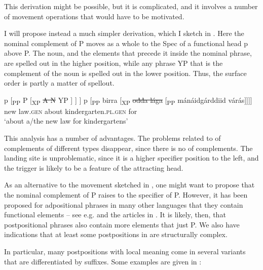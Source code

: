 \documentclass[output=paper]{LSP/langsci}
\begin{document}
This derivation might be possible, but it is complicated, and it involves a {number} of movement operations that would have to be motivated. 

I will propose instead a much simpler derivation, which I sketch in . Here the nominal complement of P moves as a whole to the Spec of a functional head p above P. The noun, and the elements that precede it inside the nominal phrase, are spelled out in the higher position, while any phrase YP that is the complement of the noun is spelled out in the lower position. Thus, the surface order is partly a matter of spellout.


\ea%
    \label{ex:julien:14}
\ea\relax    
[\textsubscript{pP} 
  [\textsubscript{XP} 
    A 
    N 
    \sout{YP}
  ] 
  p 
  [\textsubscript{PP} 
    P 
    [\textsubscript{XP} 
      \sout{A 
      N} 
      YP
    ]
  ]
]
\ex
\gll\relax  [\textsubscript{pP} [\textsubscript{XP} ođđa   {lága \sout{PP}} ] p [\textsubscript{PP} birra    {[\textsubscript{XP} \sout{ođđa lága}  [\textsubscript{PP}}   mánáidgárddiid várás]]]]\\
           {} {} new   law.\textsc{gen}   {} {}  {} about        {}       kindergarten.\textsc{pl}.\textsc{gen}      for\\
\glt      ‘about a/the new law for kindergartens’
\z
\z 

This analysis has a {number} of advantages. The problems related to  of complements of different types disappear, since there is no  of complements. The landing site is unproblematic, since it is a higher specifier position to the left, and the trigger is likely to be a feature of the attracting head.


As an alternative to the movement sketched in , one might want to propose that the nominal complement of P raises to the specifier of P. However, it has been proposed for adpositional phrases in many other languages that they contain functional elements – see e.g. \citet{Koopman2000} and the articles in \citet{Cinque2010pps}. It is likely, then, that  postpositional phrases also contain more elements that just P. We also have indications that at least some postpositions in  are structurally complex.

In particular, many postpositions with local meaning come in several variants that are differentiated by suffixes. Some examples are given in :
\end{document}
